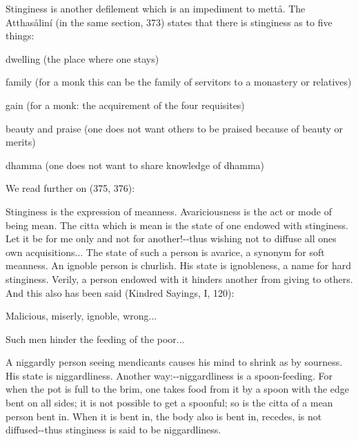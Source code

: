 \documentclass[12pt,twoside]{article}
\begin{document}
Stinginess is another defilement which is an impediment to mett{\aa}.
The Atthas{\aa}lin\'i (in the same section, 373) states that there is
stinginess as to five things:


\bigskip

dwelling (the place where one stays)

family (for a monk this can be the family of servitors to a monastery or
relatives)

gain (for a monk: the acquirement of the four requisites)

beauty and praise (one does not want others to be praised because of
beauty or merits)

dhamma (one does not want to share knowledge of dhamma)


\bigskip

We read further on (375, 376):


\bigskip

{\textasciigrave}{\textasciigrave}Stinginess{\textquotesingle}{\textquotesingle}
is the expression of meanness.
{\textasciigrave}{\textasciigrave}Avariciousness{\textquotesingle}{\textquotesingle}
is the act or mode of being mean. The citta which is mean is the state
of one endowed with stinginess. {\textasciigrave}{\textasciigrave}Let
it be for me only and not for
another!{\textquotesingle}{\textquotesingle}{}-{}-thus wishing not to
diffuse all one{\textquotesingle}s own acquisitions... The state of
such a person is
{\textasciigrave}{\textasciigrave}avarice{\textquotesingle}{\textquotesingle},
a synonym for soft meanness. An ignoble person is churlish. His state
is
{\textasciigrave}{\textasciigrave}ignobleness{\textquotesingle}{\textquotesingle},
a name for hard stinginess. Verily, a person endowed with it hinders
another from giving to others. And this also has been said (Kindred
Sayings, I, 120):

Malicious, miserly, ignoble, wrong...

Such men hinder the feeding of the poor...


\bigskip

A
{\textasciigrave}{\textasciigrave}niggardly{\textquotesingle}{\textquotesingle}
person seeing mendicants causes his mind to shrink as by sourness. His
state is
{\textasciigrave}{\textasciigrave}niggardliness{\textquotesingle}{\textquotesingle}.
Another
way:{}-{}-{\textasciigrave}{\textasciigrave}niggardliness{\textquotesingle}{\textquotesingle}
is a
{\textasciigrave}{\textasciigrave}spoon{}-feeding{\textquotesingle}{\textquotesingle}.
For when the pot is full to the brim, one takes food from it by a spoon
with the edge bent on all sides; it is not possible to get a spoonful;
so is the citta of a mean person bent in. When it is bent in, the body
also is bent in, recedes, is not diffused{}-{}-thus stinginess is said
to be niggardliness. 
\end{document}
